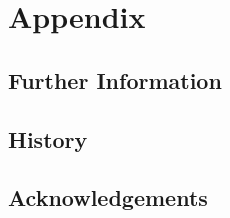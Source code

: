 \documentclass[10pt]{report}
\begin{document}
\part{Appendix}
\appendix

%

\chapter{Further Information}
  

\chapter{History}
  

\chapter {Acknowledgements}
  


\end{document}
